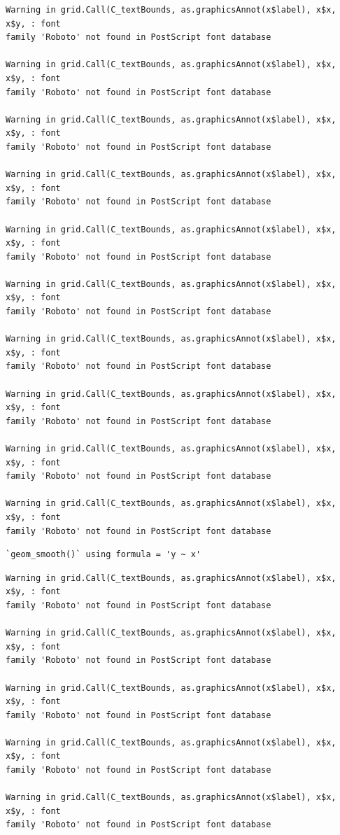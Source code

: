 \documentclass[
  letterpaper,
]{krantz}
\begin{document}
\begin{verbatim}
Warning in grid.Call(C_textBounds, as.graphicsAnnot(x$label), x$x, x$y, : font
family 'Roboto' not found in PostScript font database

Warning in grid.Call(C_textBounds, as.graphicsAnnot(x$label), x$x, x$y, : font
family 'Roboto' not found in PostScript font database

Warning in grid.Call(C_textBounds, as.graphicsAnnot(x$label), x$x, x$y, : font
family 'Roboto' not found in PostScript font database

Warning in grid.Call(C_textBounds, as.graphicsAnnot(x$label), x$x, x$y, : font
family 'Roboto' not found in PostScript font database

Warning in grid.Call(C_textBounds, as.graphicsAnnot(x$label), x$x, x$y, : font
family 'Roboto' not found in PostScript font database

Warning in grid.Call(C_textBounds, as.graphicsAnnot(x$label), x$x, x$y, : font
family 'Roboto' not found in PostScript font database

Warning in grid.Call(C_textBounds, as.graphicsAnnot(x$label), x$x, x$y, : font
family 'Roboto' not found in PostScript font database

Warning in grid.Call(C_textBounds, as.graphicsAnnot(x$label), x$x, x$y, : font
family 'Roboto' not found in PostScript font database

Warning in grid.Call(C_textBounds, as.graphicsAnnot(x$label), x$x, x$y, : font
family 'Roboto' not found in PostScript font database

Warning in grid.Call(C_textBounds, as.graphicsAnnot(x$label), x$x, x$y, : font
family 'Roboto' not found in PostScript font database
\end{verbatim}

\begin{verbatim}
`geom_smooth()` using formula = 'y ~ x'
\end{verbatim}

\begin{verbatim}
Warning in grid.Call(C_textBounds, as.graphicsAnnot(x$label), x$x, x$y, : font
family 'Roboto' not found in PostScript font database

Warning in grid.Call(C_textBounds, as.graphicsAnnot(x$label), x$x, x$y, : font
family 'Roboto' not found in PostScript font database

Warning in grid.Call(C_textBounds, as.graphicsAnnot(x$label), x$x, x$y, : font
family 'Roboto' not found in PostScript font database

Warning in grid.Call(C_textBounds, as.graphicsAnnot(x$label), x$x, x$y, : font
family 'Roboto' not found in PostScript font database

Warning in grid.Call(C_textBounds, as.graphicsAnnot(x$label), x$x, x$y, : font
family 'Roboto' not found in PostScript font database
\end{verbatim}
\end{document}
